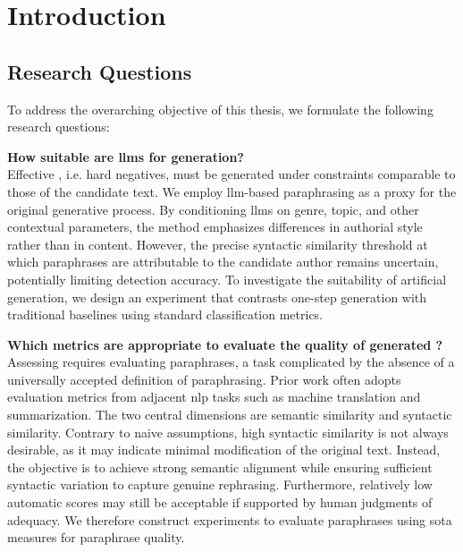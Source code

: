 \chapter{Introduction}
\label{chap:introduction}



\section{Research Questions}
\label{sec:research_questions}
To address the overarching objective of this thesis, we formulate the following research questions:
\begin{questions}
    \item \textbf{How suitable are \acp{llm} for \imp{} generation?} \label{enum:rq1} \hfill \\
    Effective \imps{}, i.e. hard negatives, must be generated under constraints comparable to those of the candidate text. 
    We employ \ac{llm}-based paraphrasing as a proxy for the original generative process. 
    By conditioning \acp{llm} on genre, topic, and other contextual parameters, the \imp{} method emphasizes differences in authorial style rather than in content. 
    However, the precise syntactic similarity threshold at which paraphrases are attributable to the candidate author remains uncertain, potentially limiting detection accuracy. 
    To investigate the suitability of artificial \imp{} generation, we design an experiment that contrasts one-step \imp{} generation with traditional baselines using standard classification metrics.

    \item \textbf{Which metrics are appropriate to evaluate the quality of generated \imps{}?} \label{enum:rq2} \hfill \\
    Assessing \imps{} requires evaluating paraphrases, a task complicated by the absence of a universally accepted definition of paraphrasing. 
    Prior work often adopts evaluation metrics from adjacent \ac{nlp} tasks such as machine translation and summarization. 
    The two central dimensions are semantic similarity and syntactic similarity. 
    Contrary to naive assumptions, high syntactic similarity is not always desirable, as it may indicate minimal modification of the original text.
    Instead, the objective is to achieve strong semantic alignment while ensuring sufficient syntactic variation to capture genuine rephrasing. 
    Furthermore, relatively low automatic scores may still be acceptable if supported by human judgments of adequacy. 
    We therefore construct experiments to evaluate paraphrases using \acl{sota} measures for paraphrase quality. 


\end{questions}
